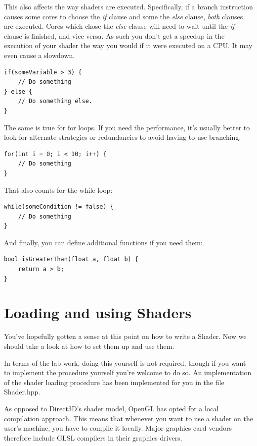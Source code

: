 This also affects the way shaders are executed. Specifically, if a branch instruction causes some cores to choose the \emph{if} clause and some the \emph{else} clause, \emph{both} clauses are executed. Cores which chose the \emph{else} clause will need to wait until the \emph{if} clause is finished, and vice versa. As such you don't get a speedup in the execution of your shader the way you would if it were executed on a CPU. It may even cause a slowdown.

\begin{verbatim}
if(someVariable > 3) {
	// Do something
} else {
	// Do something else.
}
\end{verbatim}

The same is true for for loops. If you need the performance, it's usually better to look for alternate strategies or redundancies to avoid having to use branching.

\begin{verbatim}
for(int i = 0; i < 10; i++) {
	// Do something
}
\end{verbatim}

That also counts for the while loop:

\begin{verbatim}
while(someCondition != false) {
	// Do something
}
\end{verbatim}

And finally, you can define additional functions if you need them:

\begin{verbatim}
bool isGreaterThan(float a, float b) {
	return a > b;
}
\end{verbatim}

\section{Loading and using Shaders}
\label{sec:loadshader}

You've hopefully gotten a sense at this point on how to write a Shader. Now we should take a look at how to set them up and use them. 

In terms of the lab work, doing this yourself is not required, though if you want to implement the procedure yourself you're welcome to do so. An implementation of the shader loading procedure has been implemented for you in the file Shader.hpp.

As opposed to Direct3D's shader model, OpenGL has opted for a local compilation approach. This means that whenever you want to use a shader on the user's machine, you have to compile it locally. Major graphics card vendors therefore include GLSL compilers in their graphics drivers.

